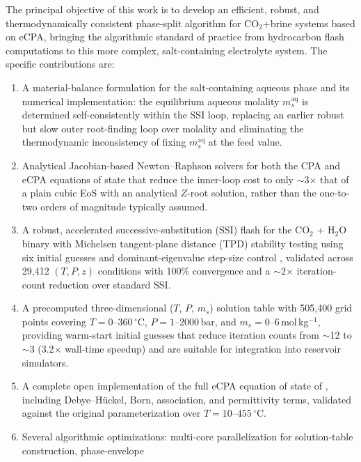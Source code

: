 \documentclass[preprint,12pt,number]{elsarticle}
\begin{document}
The principal objective of this work is to develop an efficient, robust, and
thermodynamically consistent phase-split algorithm for CO$_2$+brine systems based on eCPA,
bringing the algorithmic standard of practice from hydrocarbon flash computations to this
more complex, salt-containing electrolyte system.
The specific contributions are:
\begin{enumerate}
  \item A material-balance formulation for the salt-containing aqueous phase and its
        numerical implementation: the equilibrium aqueous molality $m_s^\mathrm{aq}$ is
        determined self-consistently within the SSI loop, replacing an earlier robust but
        slow outer root-finding loop over molality and eliminating the thermodynamic
        inconsistency of fixing $m_s^\mathrm{aq}$ at the feed value.
  \item Analytical Jacobian-based Newton--Raphson solvers for both the CPA and eCPA
        equations of state that reduce the inner-loop cost to only $\sim$3$\times$ that
        of a plain cubic EoS with an analytical $Z$-root solution, rather than the
        one-to-two orders of magnitude typically assumed.
  \item A robust, accelerated successive-substitution (SSI) flash for the CO$_2$ + H$_2$O
        binary with Michelsen tangent-plane distance (TPD) stability testing
        \citep{Michelsen1982a} using six initial guesses \citep{Jex2024} and
        dominant-eigenvalue step-size control \citep{Jex2024}, validated across 29{,}412
        $(T, P, z)$ conditions with 100\% convergence and a $\sim$2$\times$
        iteration-count reduction over standard SSI.
  \item A precomputed three-dimensional ($T$, $P$, $m_s$) solution table with
        505{,}400 grid points covering $T = 0$--$360\,^\circ$C, $P = 1$--$2000$\,bar,
        and $m_s = 0$--$6$\,mol\,kg$^{-1}$, providing warm-start initial guesses that
        reduce iteration counts from $\sim$12 to $\sim$3 (3.2$\times$ wall-time speedup)
        and are suitable for integration into reservoir simulators.
  \item A complete open implementation of the full eCPA equation of state of
        \citet{Coelho2025}, including Debye--Hückel, Born, association, and permittivity
        terms, validated against the original parameterization over $T = 10$--$455\,^\circ$C.
  \item Several algorithmic optimizations: multi-core parallelization
        for solution-table construction, phase-envelope

\end{enumerate}
\end{document}
